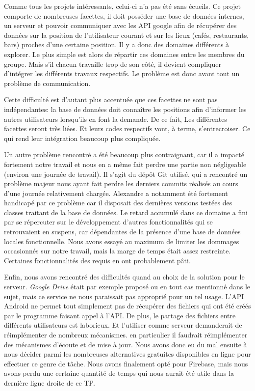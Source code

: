Comme tous les projets intéressants, celui-ci n'a pas été sans écueils. Ce projet comporte de nombreuses facettes, il doit
posséder une base de données internes, un serveur et pouvoir communiquer avec les API google afin de récupérer des données sur la
position de l'utilisateur courant et sur les lieux (cafés, restaurants, bars) proches d'une certaine position. Il y a donc des
domaines différents à explorer. Le plus simple est alors de répartir ces domaines entre les membres du groupe. Mais s'il chacun
travaille trop de son côté, il devient compliquer d'intégrer les différents travaux respectifs. Le problème est donc avant tout un
problème de communication.
\newline

Cette difficulté est d'autant plus accentuée que ces facettes ne sont pas indépendantes: la base de données doit connaître les
positions afin d'informer les autres utilisateurs lorsqu'ils en font la demande. De ce fait, Les différentes facettes seront très
liées. Et leurs codes respectifs vont, à terme, s'entrecroiser. Ce qui rend leur intégration beaucoup plus compliquée.

\newline
Un autre problème rencontré a été beaucoup plus contraignant, car il a impacté fortement notre travail et nous en a même fait perdre une partie non négligeable (environ une journée de travail). Il s'agit du dépôt Git utilisé, qui a rencontré un problème majeur nous ayant fait perdre les derniers commits réalisés au cours d'une journée relativement chargée. Alexandre a notamment été fortement handicapé par ce problème car il disposait des dernières versions testées des classes traitant de la base de données. Le retard accumulé dans ce domaine a fini par se répercuter sur le développement d'autres fonctionnalités qui se retrouvaient en suspens, car dépendantes de la présence d'une base de données locales fonctionnelle. Nous avons essayé au maximum de limiter les dommages occasionnés sur notre travail, mais la marge de temps était assez restreinte. Certaines fonctionnalités des requis en ont probablement pâti. 

Enfin, nous avons rencontré des difficultés quand au choix de la solution pour le serveur. \textit{Google Drive} était par exemple proposé ou en tout cas mentionné dans le sujet, mais ce service ne nous paraissait pas approprié pour un tel usage. L'API Android ne permet tout simplement pas de récupérer des fichiers qui
ont été créés par le programme faisant appel à l'API. De plus, le partage des fichiers entre différents utilisateurs est
laborieux. Et l'utiliser comme serveur demanderait  de réimplémenter de nombreux mécanismes. en particulier il faudrait
réimplémenter des mécanismes d'écoute et de mise à jour. Nous avons donc eu du mal ensuite à nous décider parmi les nombreuses alternatives gratuites disponibles en ligne pour effectuer ce genre de tâche. Nous avons finalement opté pour Firebase, mais nous avons perdu une certaine quantité de temps qui nous aurait été utile dans la dernière ligne droite de ce TP.